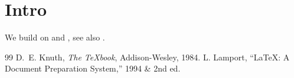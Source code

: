 \documentclass{article}
\begin{document}
\section{Intro}
We build on \cite{knuth84} and \cite{lamport94,knuth84}, see also \cite[p.~3]{lamport94}.
\begin{thebibliography}{99}
 D.~E. Knuth, \emph{The \TeX book}, Addison-Wesley, 1984.
 L. Lamport, ``\LaTeX: A Document Preparation System,'' 1994 \& 2nd ed.
\end{thebibliography}
\end{document}
